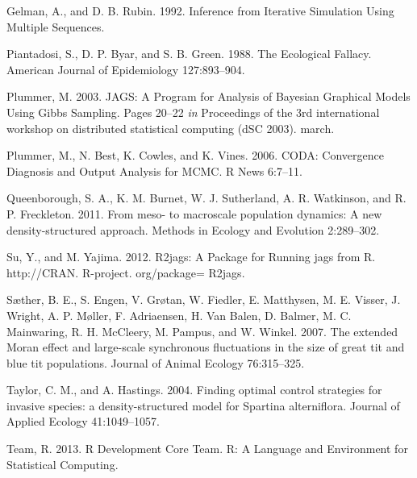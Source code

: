 \documentclass[12pt,]{article}
\begin{document}
Gelman, A., and D. B. Rubin. 1992. Inference from Iterative Simulation
Using Multiple Sequences.

Piantadosi, S., D. P. Byar, and S. B. Green. 1988. The Ecological
Fallacy. American Journal of Epidemiology 127:893--904.

Plummer, M. 2003. JAGS: A Program for Analysis of Bayesian Graphical
Models Using Gibbs Sampling. Pages 20--22 \emph{in} Proceedings of the
3rd international workshop on distributed statistical computing (dSC
2003). march.

Plummer, M., N. Best, K. Cowles, and K. Vines. 2006. CODA: Convergence
Diagnosis and Output Analysis for MCMC. R News 6:7--11.

Queenborough, S. A., K. M. Burnet, W. J. Sutherland, A. R. Watkinson,
and R. P. Freckleton. 2011. From meso- to macroscale population
dynamics: A new density-structured approach. Methods in Ecology and
Evolution 2:289--302.

Su, Y., and M. Yajima. 2012. R2jags: A Package for Running jags from R.
http://CRAN. R-project. org/package= R2jags.

Sæther, B. E., S. Engen, V. Grøtan, W. Fiedler, E. Matthysen, M. E.
Visser, J. Wright, A. P. Møller, F. Adriaensen, H. {Van Balen}, D.
Balmer, M. C. Mainwaring, R. H. McCleery, M. Pampus, and W. Winkel.
2007. The extended Moran effect and large-scale synchronous fluctuations
in the size of great tit and blue tit populations. Journal of Animal
Ecology 76:315--325.

Taylor, C. M., and A. Hastings. 2004. Finding optimal control strategies
for invasive species: a density-structured model for Spartina
alterniflora. Journal of Applied Ecology 41:1049--1057.

Team, R. 2013. R Development Core Team. R: A Language and Environment
for Statistical Computing.
\end{document}
